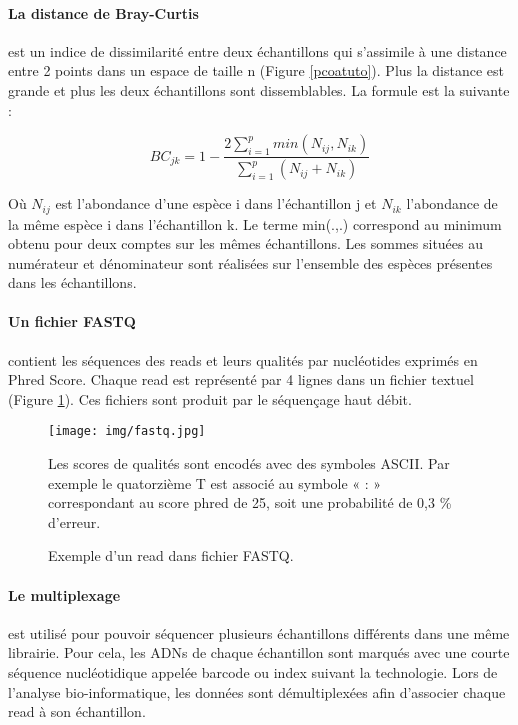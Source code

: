 \documentclass[12pt,a4paper]{article}
\begin{document}
\paragraph{La distance de Bray-Curtis} est un indice de dissimilarité entre deux échantillons qui s'assimile à une distance entre 2 points dans un espace de taille n (Figure \ref{pcoatuto}). Plus la distance est grande et plus les deux échantillons sont dissemblables. La formule est la suivante :

\begin{mycapequ}[!h]
   \begin{equation}
    BC_{jk} = 1 - \frac{2\sum_{i=1}^{p}min(N_{ij},N_{ik})}{\sum_{i=1}^{p}(N_{ij} + N_{ik})}
   \end{equation}
      \caption{Où $N_{ij}$ est l'abondance d'une  espèce i dans l'échantillon j et $N_{ik}$ l'abondance de la même espèce i dans l'échantillon k. Le terme min(.,.) correspond au minimum obtenu pour deux comptes sur les mêmes échantillons. Les sommes situées au numérateur et dénominateur sont réalisées sur l'ensemble des espèces présentes dans les échantillons.}
\end{mycapequ}


\paragraph{Un fichier FASTQ} contient les séquences des reads et leurs qualités par nucléotides exprimés en Phred Score. Chaque read est représenté par 4 lignes dans un fichier textuel (Figure \ref{fastq}). Ces fichiers sont produit par le séquençage haut débit.

\begin{figure}[!h]
\begin{center}
\texttt{[image: img/fastq.jpg]}\hfill
\end{center}
\caption{Exemple d'un  read dans fichier FASTQ.}
Les scores de qualités sont encodés avec des symboles ASCII. Par exemple le quatorzième T  est associé au symbole « : » correspondant au score phred de 25, soit une probabilité de 0,3 \% d'erreur.
\label{fastq}
\end{figure}

\paragraph{Le multiplexage} est utilisé pour pouvoir séquencer plusieurs échantillons différents dans une même librairie. Pour cela, les ADNs de chaque échantillon sont marqués avec une courte séquence nucléotidique appelée barcode ou index suivant la technologie. Lors de l'analyse bio-informatique, les données sont démultiplexées afin d'associer chaque read à son échantillon.
\end{document}
